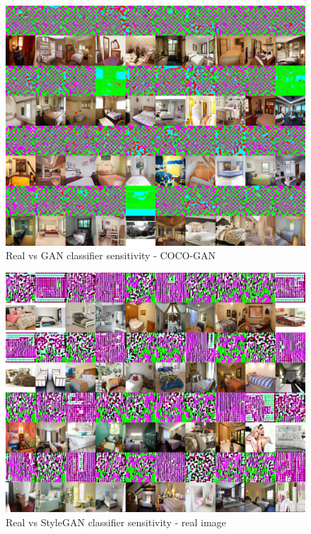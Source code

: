 \documentclass{article}
\begin{document}
    \begin{figure}[H]
      \centering
        \includegraphics[scale=.95]{smoothgrad-big/combined_model/testing-3-2-combined-dataset-coco-smoothgrad.png}
      \caption{Real vs GAN classifier sensitivity - COCO-GAN}
    \end{figure}
       
    \begin{figure}[H]
      \centering
        \includegraphics[scale=.95]{smoothgrad-big/stylegan_model/testing-2-2-combined-dataset-raw-smoothgrad.png}  
        \caption{Real vs StyleGAN classifier sensitivity - real image}
    \end{figure}
    
\end{document}
